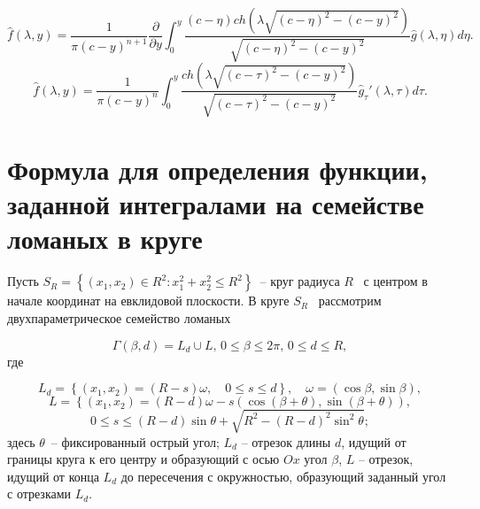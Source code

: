 \bigskip

\begin{equation*}
\widehat  f\left(\lambda ,y\right)=\frac 1{\pi \left(c-y\right)^{n+1}}\frac{{\partial}}{{\partial}y}\int
_0^y\frac{\left(c-\eta \right)\mathit{ch}\left(\lambda \sqrt{\left(c-\eta
		\right)^2-\left(c-y\right)^2}\right)}{\sqrt{\left(c-\eta \right)^2-\left(c-y\right)^2}}\widehat  g\left(\lambda ,\eta
\right)\mathit{d\eta }.
\end{equation*}
\begin{equation*}
\widehat  f\left(\lambda ,y\right)=\frac 1{\pi \left(c-y\right)^n}\int _0^y\frac{\mathit{ch}\left(\lambda
	\sqrt{\left(c-\tau \right)^2-\left(c-y\right)^2}\right)}{\sqrt{\left(c-\tau \right)^2-\left(c-y\right)^2}}\widehat
g_{\tau }'\left(\lambda ,\tau \right)d\tau .
\end{equation*}


\section{Формула для определения функции, заданной интегралами на семействе ломаных в круге}
Пусть  $S_R=\left\{\left(x_1,x_2\right){\in}R^2:x_1^2+x_2^2{\leq}R^2\right\}$\ – круг радиуса  $R$ \ с центром в
начале координат на евклидовой плоскости. В круге  $S_R$ \ рассмотрим двухпараметрическое семейство ломаных

\begin{equation*}
\Gamma \left(\beta ,d\right)=L_d{\cup}L, \, 0{\leq}\beta {\leq}2\pi , \, 0{\leq}d{\leq}R,
\end{equation*}
где

\begin{equation*}
L_d=\left\{\left(x_1,x_2\right)=\left(R-s\right)\omega ,\quad 0{\leq}s{\leq}d\right\},\quad \omega
=(\cos \beta ,\sin \beta ),
\end{equation*}
\begin{equation*}
L=\left\{\left(x_1,x_2\right)=\left(R-d\right)\omega - s\left(\cos \left(\beta +\theta \right),\sin \left(\beta +\theta
\right)\right),\right.
\end{equation*}
\begin{equation*}
0{\leq}s{\leq}\left(R-d\right)\sin \theta +\sqrt{R^2-\left(R-d\right)^2\sin ^2\theta};
\end{equation*}
здесь  $\theta $\ -- фиксированный острый угол;
$L_d$ -- отрезок длины $d$, идущий от границы круга к его центру и образующий с осью $Ox$ угол $\beta$, $L$ -- отрезок,
идущий от конца $L_d$ до пересечения с окружностью, образующий заданный угол с отрезками $L_d$.

